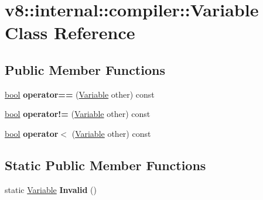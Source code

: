 \hypertarget{classv8_1_1internal_1_1compiler_1_1Variable}{}\section{v8\+:\+:internal\+:\+:compiler\+:\+:Variable Class Reference}
\label{classv8_1_1internal_1_1compiler_1_1Variable}
\subsection*{Public Member Functions}
\begin{DoxyCompactItemize}
\item 
\mbox{\label{classv8_1_1internal_1_1compiler_1_1Variable_a0432067c28f1d195bda546f51adb8742}} 
\mbox{\hyperlink{classbool}{bool}} {\bfseries operator==} (\mbox{\hyperlink{classv8_1_1internal_1_1compiler_1_1Variable}{Variable}} other) const
\item 
\mbox{\label{classv8_1_1internal_1_1compiler_1_1Variable_a92ca427458a3f428ad83876103d32608}} 
\mbox{\hyperlink{classbool}{bool}} {\bfseries operator!=} (\mbox{\hyperlink{classv8_1_1internal_1_1compiler_1_1Variable}{Variable}} other) const
\item 
\mbox{\label{classv8_1_1internal_1_1compiler_1_1Variable_ad83e3a7e3e747dfaca804fd06cd93852}} 
\mbox{\hyperlink{classbool}{bool}} {\bfseries operator$<$} (\mbox{\hyperlink{classv8_1_1internal_1_1compiler_1_1Variable}{Variable}} other) const
\end{DoxyCompactItemize}
\subsection*{Static Public Member Functions}
\begin{DoxyCompactItemize}
\item 
\mbox{\label{classv8_1_1internal_1_1compiler_1_1Variable_a32b56ccc4fa12dacc51361cc18dffcdc}} 
static \mbox{\hyperlink{classv8_1_1internal_1_1compiler_1_1Variable}{Variable}} {\bfseries Invalid} ()
\end{DoxyCompactItemize}
